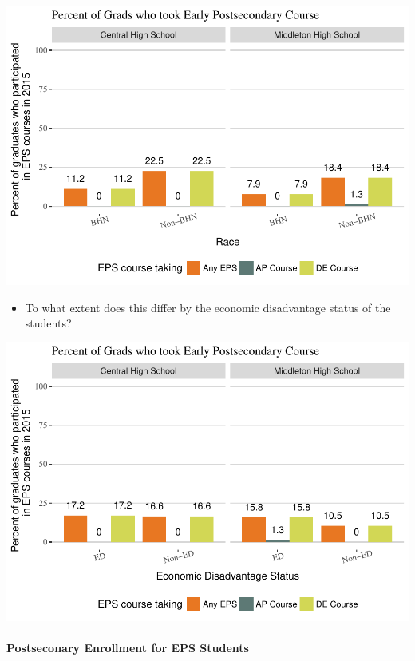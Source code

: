 \documentclass[11pt,]{article}
\providecommand{\tightlist}{%
  \setlength{\itemsep}{0pt}\setlength{\parskip}{0pt}}
\let\oldparagraph\paragraph
\renewcommand{\paragraph}[1]{\oldparagraph{#1}\mbox{}}
\begin{document}
\includegraphics{20170411_PSWRR_no_CTE_files/figure-latex/Figure9b-1.pdf}

\begin{itemize}
\tightlist
\item
  To what extent does this differ by the economic disadvantage status of
  the students?
\end{itemize}

\includegraphics{20170411_PSWRR_no_CTE_files/figure-latex/Figure9c-1.pdf}

\newpage

\paragraph{Postseconary Enrollment for EPS
Students}\label{postseconary-enrollment-for-eps-students}
\end{document}
